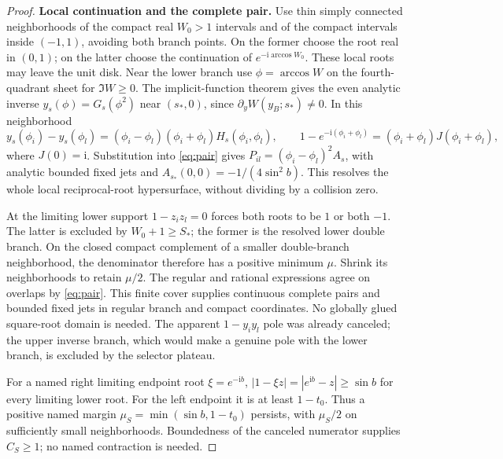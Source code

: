 \documentclass[11pt]{article}
\numberwithin{equation}{section}
\theoremstyle{definition}
\newcommand{\ii}{\mathrm i}
\begin{document}
\begin{proof}
\par\smallskip\noindent\textbf{Local continuation and the complete pair.}
Use thin simply connected neighborhoods of the compact real
\(W_0>1\) intervals and of the compact intervals inside \((-1,1)\),
avoiding both branch points. On the former choose the root real
in \((0,1)\); on the latter choose the continuation of
\(e^{-\ii\arccos W_0}\). These local roots may leave the unit disk.
Near the lower branch use \(\phi=\arccos W\) on the
fourth-quadrant sheet for \(\Im W\ge0\).
The implicit-function theorem gives the even analytic inverse
\(y_s(\phi)=G_s(\phi^2)\) near \((s_*,0)\), since
\(\partial_yW(y_B;s_*)\ne0\). In this neighborhood
\[
 y_s(\phi_i)-y_s(\phi_l)
  =(\phi_i-\phi_l)(\phi_i+\phi_l)H_s(\phi_i,\phi_l),\qquad
 1-e^{-\ii(\phi_i+\phi_l)}=(\phi_i+\phi_l)J(\phi_i+\phi_l),
\]
where \(J(0)=\ii\). Substitution into \eqref{eq:pair} gives
\(P_{il}=(\phi_i-\phi_l)^2A_s\), with analytic bounded fixed
jets and \(A_{s_*}(0,0)=-1/(4\sin^2b)\).
This resolves the whole local reciprocal-root hypersurface,
without dividing by a collision zero.

At the limiting lower support \(1-z_i z_l=0\) forces both
roots to be \(1\) or both \(-1\). The latter is excluded by
\(W_0+1\ge S_*\); the former is the resolved lower double branch.
On the closed compact complement of a smaller double-branch
neighborhood, the denominator therefore has a positive minimum
\(\mu\). Shrink its neighborhoods to retain \(\mu/2\).
The regular and rational expressions agree on overlaps by
\eqref{eq:pair}. This finite cover supplies continuous complete
pairs and bounded fixed jets in regular branch and compact
coordinates. No globally glued square-root domain is needed.
The apparent \(1-y_i y_l\) pole was already canceled; the upper
inverse branch, which would make a genuine pole with the lower
branch, is excluded by the selector plateau.

For a named right limiting endpoint root \(\xi=e^{-\ii b}\),
\(|1-\xi z|=|e^{\ii b}-z|\ge\sin b\) for every limiting lower
root. For the left endpoint it is at least \(1-t_0\).
Thus a positive named margin
\(\mu_S=\min(\sin b,1-t_0)\) persists, with \(\mu_S/2\)
on sufficiently small neighborhoods. Boundedness of the canceled
numerator supplies \(C_S\ge1\); no named contraction is needed.


\end{proof}
\end{document}
